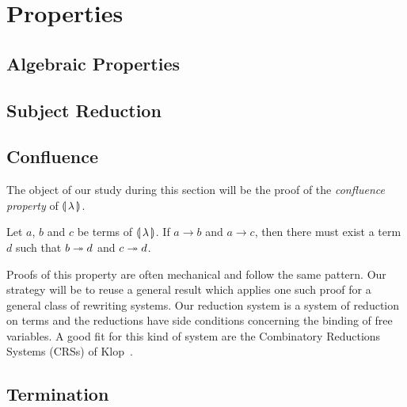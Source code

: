 \chapter{Properties}
\label{chap:properties}


\section{Algebraic Properties}
\label{sec:algebraic-properties}


\section{Subject Reduction}


\section{Confluence}

The object of our study during this section will be the proof of the
\emph{confluence property} of $\llparenthesis \, \lambda \, \rrparenthesis$.

\begin{theorem}\label{thm:confluence}
  
  Let $a$, $b$ and $c$ be terms of $\llparenthesis \, \lambda \, \rrparenthesis$. If $a \to b$ and $a
  \to c$, then there must exist a term $d$ such that $b \twoheadrightarrow d$ and $c \twoheadrightarrow
  d$.
\end{theorem}

Proofs of this property are often mechanical and follow the same
pattern. Our strategy will be to reuse a general result which applies one
such proof for a general class of rewriting systems. Our reduction system
is a system of reduction on terms and the reductions have side conditions
concerning the binding of free variables. A good fit for this kind of
system are the Combinatory Reductions Systems (CRSs) of
Klop~\cite{klop1993combinatory}.


\section{Termination}



